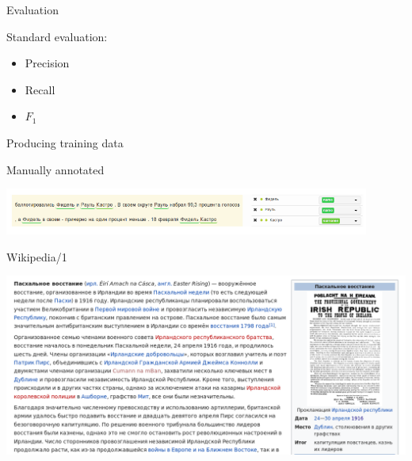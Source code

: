 \documentclass[10pt, compress]{beamer}
\begin{document}
\begin{frame}{Evaluation}

Standard evaluation:
\begin{itemize}
  \item Precision 
  \item Recall 
  \item $F_1$
\end{itemize}




\end{frame}

\begin{frame}{Producing training data}



\end{frame}

\begin{frame}{Manually annotated}

\begin{center}
  \includegraphics[width=0.9\textwidth]{graphics/factru-anno.png}
\end{center}

\end{frame}

\begin{frame}{Wikipedia/1}

\includegraphics[width=\textwidth]{graphics/wikipedia-1.png}

\end{frame}
\end{document}
